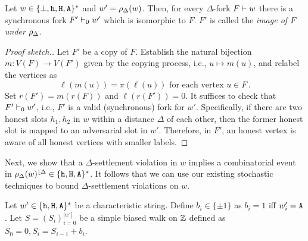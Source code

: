 \begin{proposition}\label{prop:reduction-bijection}
  Let $w \in \{\perp, \mathtt{h}, \mathtt{H}, \mathtt{A}\}^*$ 
  and $w' = \rho_\Delta(w)$. 
  Then, for every $\Delta$-fork $F \vdash w$ there is 
  a synchronous fork $F' \vdash_0 w'$ 
  which is isomorphic to $F$. 
  $F'$ is called the \emph{image of $F$ under $\rho_\Delta$}.
\end{proposition}
\begin{proof}[Proof sketch.]
  Let $F'$ be a copy of $F$. 
  Establish the natural bijection $m: V(F) \rightarrow V(F')$ 
  given by the copying process, 
  i.e., $u \mapsto m(u)$, and 
  relabel the vertices as 
  \begin{equation}\label{eq:pi-reduction}
    \text{$\ell(m(u)) = \pi(\ell(u))$ for each vertex $u \in F$}
    \,.
  \end{equation}
  Set $r(F') = m(r(F))$ and $\ell(r(F')) = 0$.
  It suffices to check that $F' \vdash_0 w'$, 
  i.e., $F'$ is a valid (synchronous) fork for $w'$. 
  Specifically, 
  if there are two honest slots $h_1, h_2$ in $w$ 
  within a distance $\Delta$ of each other, 
  then the former honest slot is mapped to 
  an adversarial slot in $w'$. 
  Therefore, in $F'$, 
  an honest vertex is aware of 
  all honest vertices with smaller labels.
% 
\end{proof}


Next, we show that 
a $\Delta$-settlement violation in $w$ implies 
a combinatorial event in $\rho_\Delta(w)^{\lfloor {\Delta}} \in \{\mathtt{h}, \mathtt{H}, \mathtt{A}\}^*$. 
It follows that we can use our existing stochastic techniques 
to bound $\Delta$-settlement violations on $w$. 

Let $w' \in \{\mathtt{h}, \mathtt{H}, \mathtt{A}\}^*$ be a characteristic string. 
Define $b_i \in \{\pm 1\}$ as $b_i = 1$ iff $w'_i = \mathtt{A}$. 
Let $S = (S_i)_{i =0}^{|w'|}$ be a simple biased walk on $\mathbb{Z}$ 
defined as $S_0 = 0, S_i = S_{i-1} + b_i$.



